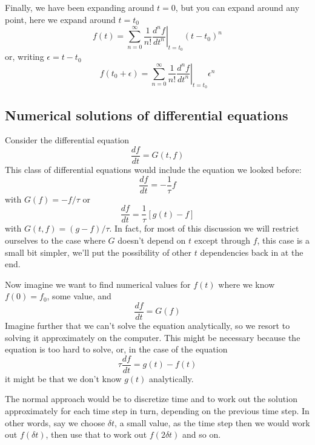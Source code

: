 \documentclass[12pt]{article}
\begin{document}
Finally, we have been expanding around $t=0$, but you can expand around any point, here we expand around $t=t_0$
\begin{equation}
f(t)=\sum_{n=0}^\infty\frac{1}{n!}\left.\frac{d^nf}{dt^n}\right|_{t=t_0}(t-t_0)^n
\end{equation}
or, writing $\epsilon=t-t_0$
\begin{equation}
f(t_0+\epsilon)=\sum_{n=0}^\infty\frac{1}{n!}\left.\frac{d^nf}{dt^n}\right|_{t=t_0}\epsilon^n
\end{equation}

\subsection*{Numerical solutions of differential equations}

Consider the differential equation
\begin{equation}
\frac{df}{dt}=G(t,f)
\end{equation}
This class of differential equations would include the equation we looked before:
\begin{equation}
\frac{df}{dt}=-\frac{1}{\tau}f
\end{equation}
with $G(f)=-f/\tau$ or
\begin{equation}
\frac{df}{dt}=\frac{1}{\tau}[g(t)-f]
\end{equation}
with $G(t,f)=(g-f)/\tau$. In fact, for most of this discussion we will
restrict ourselves to the case where $G$ doesn't depend on $t$ except
through $f$, this case is a small bit simpler, we'll put the
possibility of other $t$ dependencies back in at the end.

Now imagine we want to find numerical values for $f(t)$ where we know
$f(0)=f_0$, some value, and
\begin{equation}
\frac{df}{dt}=G(f)
\end{equation}
Imagine further that we can't solve the equation analytically, so we
resort to solving it approximately on the computer. This might be
necessary because the equation is too hard to solve, or, in the case
of the equation
\begin{equation}
\tau\frac{df}{dt}=g(t)-f(t)
\end{equation}
it might be that we don't know $g(t)$ analytically.

The normal approach would be to discretize time and to work out the
solution approximately for each time step in turn, depending on the
previous time step. In other words, say we choose $\delta t$, a small
value, as the time step then we would work out $f(\delta t)$, then use
that to work out $f(2\delta t)$ and so on.
\end{document}
